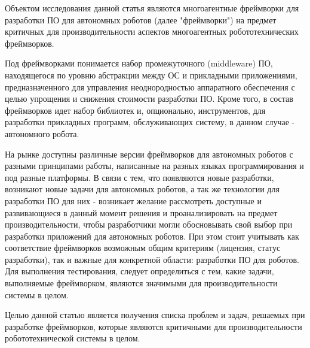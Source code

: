 Объектом исследования данной статья являются многоагентные фреймворки для разработки ПО для автономных роботов (далее "фреймворки") на предмет критичных для производительности аспектов многоагентных робототехнических фреймворков.

Под фреймворками понимается набор промежуточного (middleware) ПО, находящегося по уровню абстракции между ОС и прикладными приложениями, предназначенного для управления неоднородностью аппаратного обеспечения с целью упрощения и снижения стоимости разработки ПО.
Кроме того, в состав фреймворков идет набор библиотек и, опционально, инструментов, для разработки прикладных программ, обслуживающих систему, в данном случае - автономного робота.

На рынке доступны различные версии фреймворков для автономных роботов с разными принципами работы, написанные на разных языках программирования и под разные платформы. В связи с тем, что появляются новые разработки, возникают новые задачи для автономных роботов, а так же технологии для разработки ПО для них - возникает желание рассмотреть доступные и развивающиеся в данный момент решения и проанализировать на предмет производительности, чтобы разработчики могли обосновывать свой выбор при разработки приложений для автономных роботов. При этом стоит учитывать как соответствие фреймворков возможным общим критериям (лицензия, статус разработки), так и важные для конкретной области: разработки ПО для роботов. Для выполнения тестирования, следует определиться с тем, какие задачи, выполняемые фреймворком, являются значимыми для производительности системы в целом.

Целью данной статью является получения списка проблем и задач, решаемых при разработке фреймворков, которые являются критичными для производительности робототехнической системы в целом.